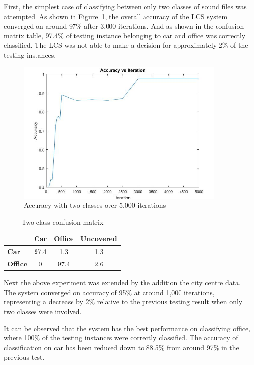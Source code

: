 \documentclass[11pt]{article}
\begin{document}
First, the simplest case of classifying between only two classes of sound files was attempted. As shown in Figure~\ref{fig:twoClass}, the overall accuracy of the LCS system converged on around 97\% after 3,000 iterations. And as shown in the confusion matrix table, 97.4\% of testing instance belonging to car and office was correctly classified. The LCS was not able to make a decision for approximately 2\% of the testing instances.

\begin{figure}[!htbp]
	\centering
	\includegraphics[width=0.6\linewidth]{yiyang_figures/1.png}
	\caption{Accuracy with two classes over 5,000 iterations}
	\label{fig:twoClass}
\end{figure}

\begin{table}[!htbp]
	\centering
	\caption{Two class confusion matrix}
	\label{tab:conf2}
	\begin{tabularx}{0.43\textwidth}{lccc}
		\toprule
		                & \textbf{Car} & \textbf{Office} & \textbf{Uncovered} \\ \midrule
		 \textbf{Car}   &     97.4     & 1.3             & 1.3                \\
		\textbf{Office} &      0       & 97.4            & 2.6                \\ \bottomrule
	\end{tabularx}
\end{table}



Next the above experiment was extended by the addition the city centre data. The system converged on accuracy of 95\% at around 1,000 iterations, representing a decrease by 2\% relative to the previous testing result when only two classes were involved.

It can be observed that the system has the best performance on classifying office, where 100\% of the testing instances were correctly classified. The accuracy of classification on car has been reduced down to 88.5\% from around 97\% in the previous test.
\end{document}
